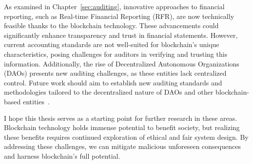 As examined in Chapter~\ref{sec:auditing}, innovative approaches to financial reporting, such as Real-time Financial Reporting (RFR), are now technically feasible thanks to the blockchain technology. These advancements could significantly enhance transparency and trust in financial statements. However, current accounting standards are not well-suited for blockchain's unique characteristics, posing challenges for auditors in verifying and trusting this information. Additionally, the rise of Decentralized Autonomous Organizations (DAOs) presents new auditing challenges, as these entities lack centralized control. Future work should aim to establish new auditing standards and methodologies tailored to the decentralized nature of DAOs and other blockchain-based entities~\cite{tan2023open}.

I hope this thesis serves as a starting point for further research in these areas. Blockchain technology holds immense potential to benefit society, but realizing these benefits requires continued exploration of ethical and fair system design. By addressing these challenges, we can mitigate malicious unforeseen consequences and harness blockchain's full potential.

